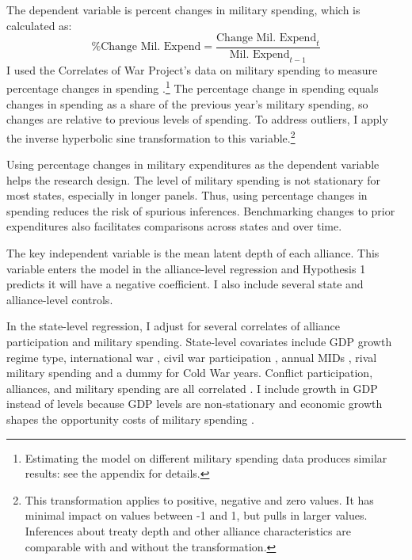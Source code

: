 \documentclass[12pt]{article}
\begin{document}
The dependent variable is percent changes in military spending, which is calculated as:
\begin{equation}
\mbox{\% Change Mil. Expend} = \frac{ \mbox{Change Mil. Expend}_t }{ \mbox{Mil. Expend}_{t-1} }
\end{equation} 
I used the Correlates of War Project's data on military spending to measure percentage changes in spending \citep{SingerCINC1988}.\footnote{Estimating the model on different military spending data produces similar results: see the appendix for details.} 
The percentage change in spending equals changes in spending as a share of the previous year's military spending, so changes are relative to previous levels of spending. 
To address outliers, I apply the inverse hyperbolic sine transformation to this variable.\footnote{This transformation applies to positive, negative and zero values. It has minimal impact on values between -1 and 1, but pulls in larger values. Inferences about treaty depth and other alliance characteristics are comparable with and without the transformation.}


Using percentage changes in military expenditures as the dependent variable helps the research design. 
The level of military spending is not stationary for most states, especially in longer panels. 
Thus, using percentage changes in spending reduces the risk of spurious inferences.
Benchmarking changes to prior expenditures also facilitates comparisons across states and over time. 


The key independent variable is the mean latent depth of each alliance. 
This variable enters the model in the alliance-level regression and Hypothesis 1 predicts it will have a negative coefficient. 
I also include several state and alliance-level controls. 


In the state-level regression, I adjust for several correlates of alliance participation and military spending. 
State-level covariates include GDP growth \citep{Boltetal2018} regime type, international war \citep{Reiteretal2016}, civil war participation \citep{SarkeesWayman2010}, annual MIDs \citep{Gibleretal2016}, rival military spending \citep{ThompsonDreyer2012} and a dummy for Cold War years.
Conflict participation, alliances, and military spending are all correlated \citep{SeneseVasquez2008}.
I include growth in GDP instead of levels because GDP levels are non-stationary and economic growth shapes the opportunity costs of military spending \citep{Kimball2010, Zielinskietal2017}.  
\end{document}
